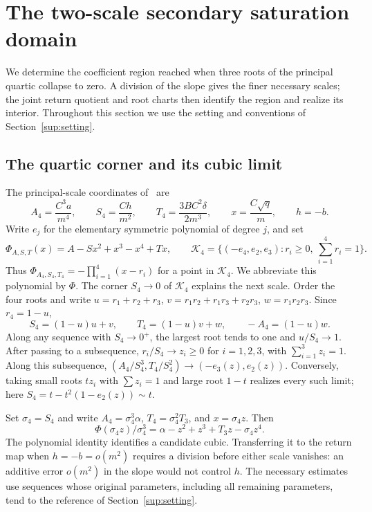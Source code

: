 \section{The two-scale secondary saturation domain}\label{corner:section}

We determine the coefficient region reached when three roots of the
principal quartic collapse to zero. A division of the slope gives the finer
necessary scales; the joint return quotient and root charts then identify
the region and realize its interior.
Throughout this section we use the setting and conventions of
Section~\ref{sup:setting}.

\subsection{The quartic corner and its cubic limit}

The principal-scale coordinates
of~\cite[Section~\ref*{main-subsec:four-root-limit}]{main2026} are
\[
 A_4=\frac{C^3a}{m^4},\qquad S_4=\frac{Ch}{m^2},\qquad
 T_4=\frac{3BC^2\delta}{2m^3},\qquad x=\frac{C\sqrt q}{m},
 \qquad h=-b.
\]
Write $e_j$ for the elementary symmetric polynomial of degree $j$, and set
\[
 \Phi_{A,S,T}(x)=A-Sx^2+x^3-x^4+Tx,\qquad
 \mathcal K_4=\{(-e_4,e_2,e_3):r_i\geq0,\ \textstyle\sum_{i=1}^4r_i=1\}.
\]
Thus $\Phi_{A_4,S_4,T_4}=-\prod_{i=1}^4(x-r_i)$ for a point in
$\mathcal K_4$. We abbreviate this polynomial by $\Phi$.
The corner $S_4\to0$ of $\mathcal K_4$ explains the next scale.
Order the four roots and write $u=r_1+r_2+r_3$, $v=r_1r_2+r_1r_3+r_2r_3$,
$w=r_1r_2r_3$. Since $r_4=1-u$,
\[
 S_4=(1-u)u+v,\qquad T_4=(1-u)v+w,\qquad -A_4=(1-u)w.
\]
Along any sequence with $S_4\to0^+$, the largest root tends to one and
$u/S_4\to1$. After passing to a subsequence, $r_i/S_4\to z_i\ge0$ for
$i=1,2,3$, with $\sum_{i=1}^3z_i=1$. Along this subsequence,
$(A_4/S_4^3,T_4/S_4^2)\to(-e_3(z),e_2(z))$.
Conversely, taking small roots $t z_i$ with $\sum z_i=1$
and large root $1-t$ realizes every such limit; here
$S_4=t-t^2(1-e_2(z))\sim t$.

Set $\sigma_4=S_4$ and write $A_4=\sigma_4^3\alpha$,
$T_4=\sigma_4^2T_3$, and $x=\sigma_4z$. Then
\[
 \Phi(\sigma_4z)/\sigma_4^3
 =\alpha-z^2+z^3+T_3 z-\sigma_4z^4.
\]
The polynomial identity identifies a candidate cubic. Transferring it to
the return map when $h=-b=o(m^2)$ requires a division before either scale
vanishes: an additive error $o(m^2)$ in the slope would not control $h$.
The necessary estimates use sequences whose original parameters, including
all remaining parameters, tend to the reference of Section~\ref{sup:setting}.


